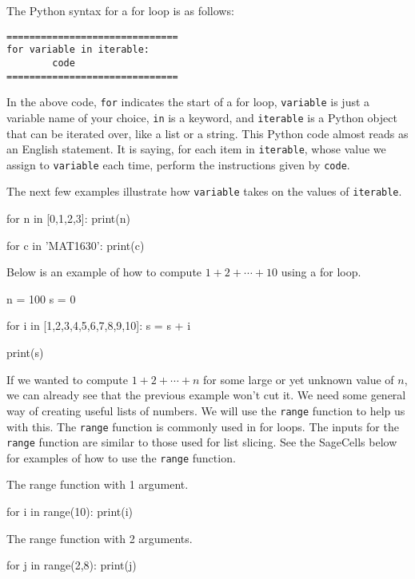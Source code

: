 \documentclass{ximera}
\begin{document}
The Python syntax for a for loop is as follows:

\begin{verbatim}
==============================
for variable in iterable:
        code
==============================
\end{verbatim}

In the above code, \verb|for| indicates the start of a for loop, \verb|variable| is just a variable name of your choice, \verb|in| is a keyword, and \verb|iterable| is a Python object that can be iterated over, like a list or a string. This Python code almost reads as an English statement. It is saying, for each item in \verb|iterable|, whose value we assign to \verb|variable| each time, perform the instructions given by \verb|code|.

The next few examples illustrate how \verb|variable| takes on the values of \verb|iterable|.

\begin{sageCell}
for n in [0,1,2,3]:
        print(n)
\end{sageCell}

\begin{sageCell}
for c in 'MAT1630':
        print(c)
\end{sageCell}

Below is an example of how to compute $1+2+\cdots+10$ using a for loop.

\begin{sageCell}
n = 100
s = 0

for i in [1,2,3,4,5,6,7,8,9,10]:
        s = s + i

print(s)
\end{sageCell}

If we wanted to compute $1+2+\cdots+n$ for some large or yet unknown value of $n$, we can already see that the previous example won't cut it. We need some general way of creating useful lists of numbers. We will use the \verb|range| function to help us with this. The \verb|range| function is commonly used in for loops. The inputs for the \verb|range| function are similar to those used for list slicing. See the SageCells below for examples of how to use the \verb|range| function.

The range function with 1 argument.
\begin{sageCell}
for i in range(10):
     print(i)
\end{sageCell}

The range function with 2 arguments.
\begin{sageCell}
for j in range(2,8):
     print(j)
\end{sageCell}
\end{document}
